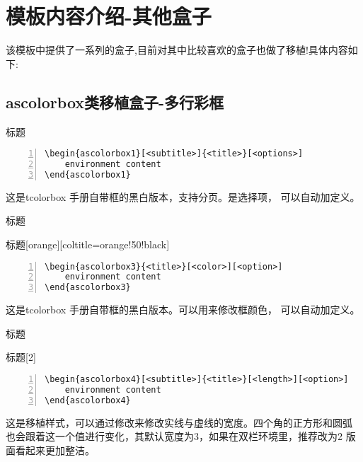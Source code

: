 \section{模板内容介绍-其他盒子}
该模板中提供了一系列的盒子,目前对其中比较喜欢的盒子也做了移植!具体内容如下:
\subsection{ascolorbox类移植盒子-多行彩框}

\begin{ascolorbox1}[子标题]{标题}
\zhlipsum[1]
\end{ascolorbox1}
\begin{lstlisting}[backgroundcolor=\color{gray!5},framerule=1pt,frame=tb,numbers=left,
    numberstyle=\tiny\color{black},]
\begin{ascolorbox1}[<subtitle>]{<title>}[<options>]
    environment content
\end{ascolorbox1}
\end{lstlisting}
这是tcolorbox 手册自带框的黑白版本，支持分页。\md{[⟨subtitle⟩]}是选择项，\md{[⟨option⟩]} 可以自动加定义。

\begin{ascolorbox3}{标题}
    \zhlipsum[1]
\end{ascolorbox3}

\begin{ascolorbox3}{标题}[orange][coltitle=orange!50!black]
    \zhlipsum[1]
\end{ascolorbox3}
\begin{lstlisting}[backgroundcolor=\color{gray!5},framerule=1pt,frame=tb,numbers=left,
    numberstyle=\tiny\color{black},]
\begin{ascolorbox3}{<title>}[<color>][<option>]
    environment content
\end{ascolorbox3}
\end{lstlisting}
这是tcolorbox 手册自带框的黑白版本。可以用来修改框颜色， 可以自动加定义。

\begin{ascolorbox4}[子标题]{标题}
    \zhlipsum[1]
\end{ascolorbox4}

\begin{ascolorbox4}[子标题]{标题}[2]
    \zhlipsum[1]
\end{ascolorbox4}

\begin{lstlisting}[backgroundcolor=\color{gray!5},framerule=1pt,frame=tb,numbers=left,
    numberstyle=\tiny\color{black},]
\begin{ascolorbox4}[<subtitle>]{<title>}[<length>][<option>]
    environment content
\end{ascolorbox4}
\end{lstlisting}
这是移植样式，可以通过修改\md{[⟨length⟩]}来修改实线与虚线的宽度。四个角的正方形和圆弧
也会跟着这一个值进行变化，其默认宽度为3，如果在双栏环境里，推荐改为2 版面看起来更加整洁。

